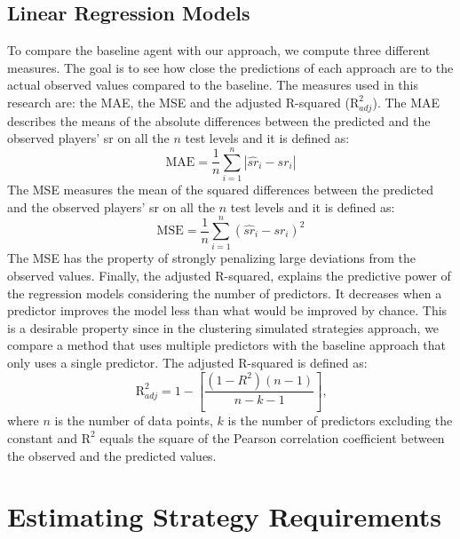 \subsection{Linear Regression Models}
To compare the baseline agent with our approach, we compute three different measures. The goal is to see how close the predictions of each approach are to the actual observed values compared to the baseline. The measures used in this research are: the \acf{MAE}, the \acf{MSE} and the adjusted R-squared ($\text{R}^2_{adj}$).
The \acs{MAE} describes the means of the absolute differences between the predicted and the observed players' \acs{sr} on all the $n$ test levels and it is defined as:
\begin{equation}
    \text{MAE} = \frac{1}{n} \sum_{i=1}^{n} |\widehat{sr}_i - {sr}_i| 
\end{equation}
The \acs{MSE} measures the mean of the squared differences between the predicted and the observed players' \acs{sr} on all the $n$ test levels and it is defined as:
\begin{equation}
    \text{MSE} = \frac{1}{n} \sum_{i=1}^{n} (\widehat{sr}_i - {sr}_i)^2
\end{equation}
The \acs{MSE} has the property of strongly penalizing large deviations from the observed values.
Finally, the adjusted R-squared, explains the predictive power of the regression models considering the number of predictors. It decreases when a predictor improves the model less than what would be improved by chance. This is a desirable property since in the clustering simulated strategies approach, we compare a method that uses multiple predictors with the baseline approach that only uses a single predictor. The adjusted R-squared is defined as:
\begin{equation}
    \text{R}^2_{adj} = 1 - [\frac{(1-R^2)(n-1)}{n-k-1}] \text{,}
\end{equation}
where $n$ is the number of data points, $k$ is the number of predictors excluding the constant and $\text{R}^2$ equals the square of the Pearson correlation coefficient \cite{benesty_pearson_2009} between the observed and the predicted values.


\section{Estimating Strategy Requirements}

